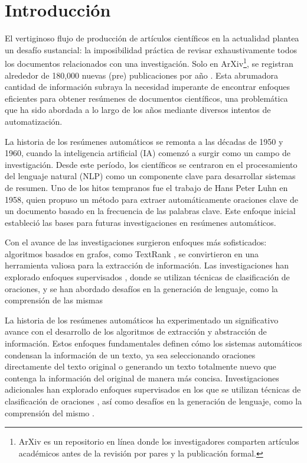 \chapter*{Introducción}\label{chapter:introduction}

    El vertiginoso flujo de producción de artículos científicos en la actualidad plantea un desafío sustancial: la imposibilidad práctica de revisar exhaustivamente todos los documentos relacionados con una investigación. Solo en ArXiv\footnote{ArXiv es un repositorio en línea donde los investigadores comparten artículos académicos antes de la revisión por pares y la publicación formal.}, se registran alrededor de 180,000 nuevas (pre) publicaciones por año \cite{arxivstats}. Esta abrumadora cantidad de información subraya la necesidad imperante de encontrar enfoques eficientes para obtener resúmenes de documentos científicos, una problemática que ha sido abordada a lo largo de los años mediante diversos intentos de automatización.

    La historia de los resúmenes automáticos se remonta a las décadas de 1950 y 1960, cuando la inteligencia artificial (IA) comenzó a surgir como un campo de investigación. Desde este período, los científicos se centraron en el procesamiento del lenguaje natural (NLP) como un componente clave para desarrollar sistemas de resumen. Uno de los hitos tempranos fue el trabajo de Hans Peter Luhn en 1958\cite{luhun1958}, quien propuso un método para extraer automáticamente oraciones clave de un documento basado en la frecuencia de las palabras clave. Este enfoque inicial estableció las bases para futuras investigaciones en resúmenes automáticos.

    Con el avance de las investigaciones surgieron enfoques más sofisticados: algoritmos basados en grafos, como TextRank \cite{mihalcea2004textrank}, se convirtieron en una herramienta valiosa para la extracción de información. Las investigaciones han explorado enfoques supervisados \cite{collins-etal-2017-supervised}, donde se utilizan técnicas de clasificación de oraciones, y se han abordado desafíos en la generación de lenguaje, como la comprensión de las mismas \cite{knight2000statistics}

    La historia de los resúmenes automáticos ha experimentado un significativo avance con el desarrollo de los algoritmos de extracción y abstracción de información. Estos enfoques fundamentales definen cómo los sistemas automáticos condensan la información de un texto, ya sea seleccionando oraciones directamente del texto original o generando un texto totalmente nuevo que contenga la información del original de manera más concisa. Investigaciones adicionales han explorado enfoques supervisados en los que se utilizan técnicas de clasificación de oraciones \cite{collins-etal-2017-supervised}, así como desafíos en la generación de lenguaje, como la comprensión del mismo \cite{knight2000statistics}.

